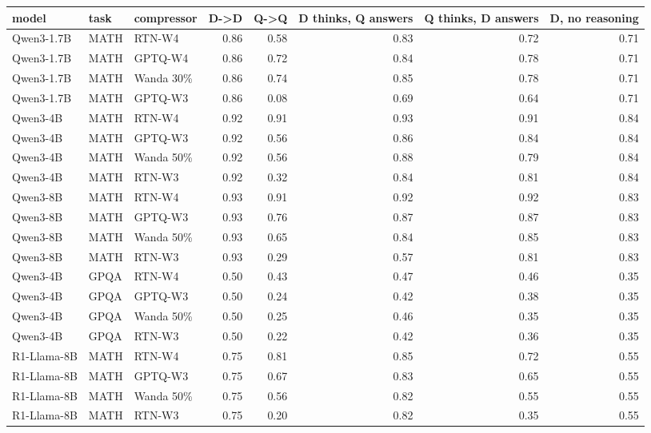 \begin{tabular}{lllrrrrr}
\toprule
model & task & compressor & D->D & Q->Q & D thinks, Q answers & Q thinks, D answers & D, no reasoning \\
\midrule
Qwen3-1.7B & MATH & RTN-W4 & 0.86 & 0.58 & 0.83 & 0.72 & 0.71 \\
Qwen3-1.7B & MATH & GPTQ-W4 & 0.86 & 0.72 & 0.84 & 0.78 & 0.71 \\
Qwen3-1.7B & MATH & Wanda 30\% & 0.86 & 0.74 & 0.85 & 0.78 & 0.71 \\
Qwen3-1.7B & MATH & GPTQ-W3 & 0.86 & 0.08 & 0.69 & 0.64 & 0.71 \\
Qwen3-4B & MATH & RTN-W4 & 0.92 & 0.91 & 0.93 & 0.91 & 0.84 \\
Qwen3-4B & MATH & GPTQ-W3 & 0.92 & 0.56 & 0.86 & 0.84 & 0.84 \\
Qwen3-4B & MATH & Wanda 50\% & 0.92 & 0.56 & 0.88 & 0.79 & 0.84 \\
Qwen3-4B & MATH & RTN-W3 & 0.92 & 0.32 & 0.84 & 0.81 & 0.84 \\
Qwen3-8B & MATH & RTN-W4 & 0.93 & 0.91 & 0.92 & 0.92 & 0.83 \\
Qwen3-8B & MATH & GPTQ-W3 & 0.93 & 0.76 & 0.87 & 0.87 & 0.83 \\
Qwen3-8B & MATH & Wanda 50\% & 0.93 & 0.65 & 0.84 & 0.85 & 0.83 \\
Qwen3-8B & MATH & RTN-W3 & 0.93 & 0.29 & 0.57 & 0.81 & 0.83 \\
Qwen3-4B & GPQA & RTN-W4 & 0.50 & 0.43 & 0.47 & 0.46 & 0.35 \\
Qwen3-4B & GPQA & GPTQ-W3 & 0.50 & 0.24 & 0.42 & 0.38 & 0.35 \\
Qwen3-4B & GPQA & Wanda 50\% & 0.50 & 0.25 & 0.46 & 0.35 & 0.35 \\
Qwen3-4B & GPQA & RTN-W3 & 0.50 & 0.22 & 0.42 & 0.36 & 0.35 \\
R1-Llama-8B & MATH & RTN-W4 & 0.75 & 0.81 & 0.85 & 0.72 & 0.55 \\
R1-Llama-8B & MATH & GPTQ-W3 & 0.75 & 0.67 & 0.83 & 0.65 & 0.55 \\
R1-Llama-8B & MATH & Wanda 50\% & 0.75 & 0.56 & 0.82 & 0.55 & 0.55 \\
R1-Llama-8B & MATH & RTN-W3 & 0.75 & 0.20 & 0.82 & 0.35 & 0.55 \\
\bottomrule
\end{tabular}
